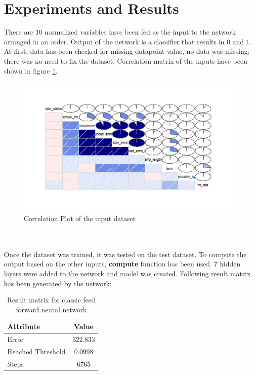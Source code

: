 \documentclass{article}[]
\begin{document}
\section{Experiments and Results}
There are $10$ normalized variables have been fed as the input to the network arranged in an order. Output of the network is a classifier that results in $0$ and $1$. At first, data has been checked for missing datapoint value, no data was missing; there was no need to fix the dataset. Correlation matrix of the inputs have been shown in figure \ref{fig:image1}.
\begin{figure}[!htb]
\centering
\includegraphics[width=1\textwidth]{image2.png}
\caption{Correlation Plot of the input dataset}
\label{fig:image1}
\end{figure}\\\\
Once the dataset was trained, it was tested on the test dataset. To compute the output based on the other inputs, \textbf{compute} function has been used. $7$ hidden layers were added to the network and model was created. Following result matrix has been generated by the network:
\begin{table} 
\caption{Result matrix for classic feed forward neural network} %
\centering      %
\begin{tabular}{l|c}  %
\hline                      %
{\bf Attribute}&{\bf Value}\\
\hline                    %
Error & 322.833\\
Reached Threshold & 0.0998\\
Steps & 6765\\
\hline     %
\end{tabular} 
\label{table:params} 
\end{table} \\\\
\end{document}
